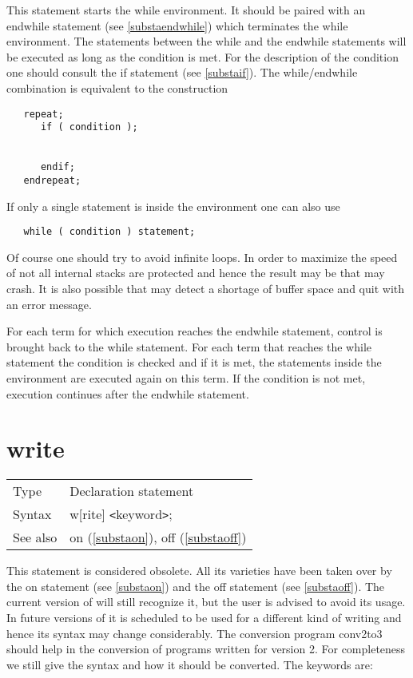 \noindent This statement starts the while 
environment. It should be paired with an 
endwhile statement (see \ref{substaendwhile}) which 
terminates the while environment. The statements between the while and the 
endwhile statements will be executed as long as the condition is met. For 
the description of the condition one should consult the if 
statement (see \ref{substaif}). The while/endwhile combination is 
equivalent to the construction
\begin{verbatim}
   repeat;
      if ( condition );


      endif;
   endrepeat;
\end{verbatim}
If only a single statement is inside the environment one can also use
\begin{verbatim}
   while ( condition ) statement;
\end{verbatim}
Of course one should try to avoid infinite 
loops. In order to maximize the speed of {\FORM} not 
all internal stacks are protected and hence the result may be that {\FORM} 
may crash. It is also possible that {\FORM} may detect a shortage of buffer 
space and quit with an error message. \vspace{4mm}

\noindent For each term for which execution reaches the endwhile statement, 
control is brought back to the while statement. For each term that reaches 
the while statement the condition is checked and if it is met, the 
statements inside the environment are executed again on this term. If the 
condition is not met, execution continues after the endwhile statement. 
\vspace{10mm}


\section{write}
\label{substawrite}

\noindent \begin{tabular}{ll}
Type & Declaration statement\\
Syntax & w[rite] {\tt<}keyword{\tt>};
\\ See also & on (\ref{substaon}), off (\ref{substaoff})
\end{tabular} \vspace{4mm}

\noindent This statement is considered 
obsolete. All its varieties have been taken over by the 
on statement (see \ref{substaon}) and the off 
statement (see \ref{substaoff}). The current version of {\FORM} will still 
recognize it, but the user is advised to avoid its usage. In future 
versions of {\FORM} it is scheduled to be used for a different kind of 
writing and hence its syntax may change considerably. The conversion 
program conv2to3 should help in the conversion of programs written for 
version 2. For completeness we still give the syntax and how it should be 
converted. The keywords are: \vspace{4mm}
 
